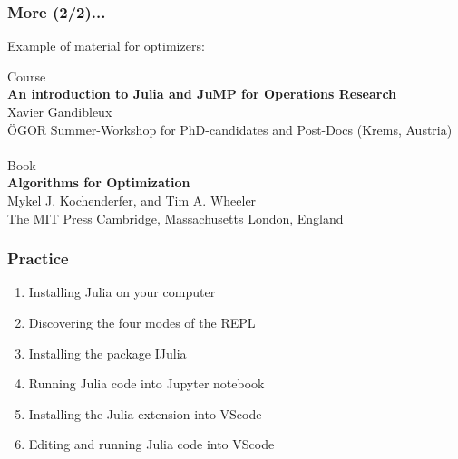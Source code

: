 \documentclass[]{beamer}
\begin{document}
\begin{frame}
  \frametitle{More (2/2)...}
\vspace{3mm}

Example of material for optimizers:\vspace{6mm}\\
{\footnotesize

Course \vspace{2mm}\\
\quad \textbf{An introduction to Julia and JuMP for Operations Research}\\
\quad Xavier Gandibleux\\
\quad ÖGOR Summer-Workshop for PhD-candidates and Post-Docs (Krems, Austria)\\
\vspace{6mm}\\

Book \vspace{2mm}\\
\quad \textbf{Algorithms for Optimization}\\
\quad Mykel J. Kochenderfer, and Tim A. Wheeler\\
\quad The MIT Press Cambridge, Massachusetts London, England\\

}
\end{frame}

% 
%

\begin{frame}
  \frametitle{Practice}
\vspace{3mm}

\begin{enumerate}
\item Installing Julia on your computer

\item Discovering the four modes of the REPL\vspace{3mm}

\item Installing the package IJulia

\item Running Julia code into Jupyter notebook\vspace{3mm}

\item Installing the Julia extension into VScode

\item Editing and running Julia code into  VScode
\end{enumerate}

\end{frame}
\end{document}
